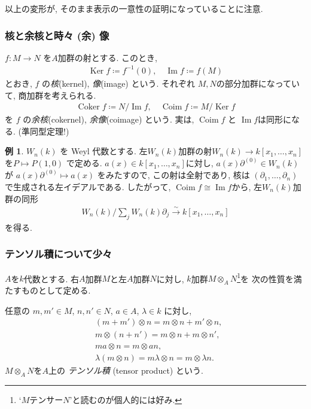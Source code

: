 \documentclass[11pt, a4paper, dvipdfmx]{jsarticle}
\theoremstyle{definition}
\newtheorem{Example}[Axiom]{例}
\newcommand{\p}{\partial}
\newcommand{\Ker}{\mathop{\mathrm{Ker}}\nolimits}
\newcommand{\Img}{\mathop{\mathrm{Im}}\nolimits}
\newcommand{\Cok}{\mathop{\mathrm{Coker}}\nolimits}
\newcommand{\Cim}{\mathop{\mathrm{Coim}}\nolimits}
\numberwithin{equation}{section}
\begin{document}
以上の変形が, そのまま表示の一意性の証明になっていることに注意. 


\subsubsection*{核と余核と時々 (余) 像}

$f\colon M\to N$ を$A$加群の射とする. このとき, 
\begin{align*}
    \Ker f \coloneqq f^{-1}(0),\quad
    \Img f \coloneqq f(M)
\end{align*}
とおき, $f$ の\emph{核}(kernel), \emph{像}(image) という. 
それぞれ $M, N$の部分加群になっていて, 商加群を考えられる. 
\begin{align*}
    \Cok f \coloneqq N/\Img f,\quad
    \Cim f \coloneqq M/\Ker f
\end{align*}
を $f$ の\emph{余核}(cokernel), 
\emph{余像}(coimage) という. 
実は, $\Cim f$ と $\Img f$は同形になる. (準同型定理!)

\begin{Example}\label{ex:weyl}
    $W_n(k)$ を Weyl 代数とする. 
    左$W_n(k)$加群の射$W_n(k)\to k[x_1,\ldots,x_n]$
    を$P\mapsto P(1,0)$ で定める. 
    $a(x)\in k[x_1,\ldots,x_n]$に対し, 
    $a(x)\p^{(0)}\in W_n(k)$が
    $a(x)\p^{(0)} \mapsto a(x)$
    をみたすので, 
    この射は全射であり, 核は
    $(\p_1,\ldots,\p_n)$
    で生成される左イデアルである. 
    したがって, $\Cim f \cong \Img f$から, 
    左$W_n(k)$加群の同形
    \begin{align}
        W_n(k)/\sum_j W_n(k)\p_j \xrightarrow{\sim} k[x_1,\ldots,x_n]
    \end{align}
    を得る. 
\end{Example}
\subsubsection*{テンソル積について少々} 

$A$を$k$代数とする. 
右$A$加群$M$と左$A$加群$N$に対し, 
$k$加群$M\otimes_A N$\footnote{
    `$M$テンサー$N$'と読むのが個人的には好み. 
}を
次の性質を満たすものとして定める. 

任意の $m,m'\in M$, $n,n'\in N$, $a\in A$, $\lambda \in k$
に対し, 
\begin{align*}
    &(m+m')\otimes n = m\otimes n + m'\otimes n, \\ 
    &m\otimes (n+n') = m\otimes n + m\otimes n', \\
    &ma\otimes n = m \otimes an, \\
    &\lambda (m\otimes n) = m\lambda \otimes n 
    =m\otimes \lambda n.
\end{align*}
$M\otimes_A N$を$A$上の
\emph{テンソル積} (tensor product) という. 
\end{document}
